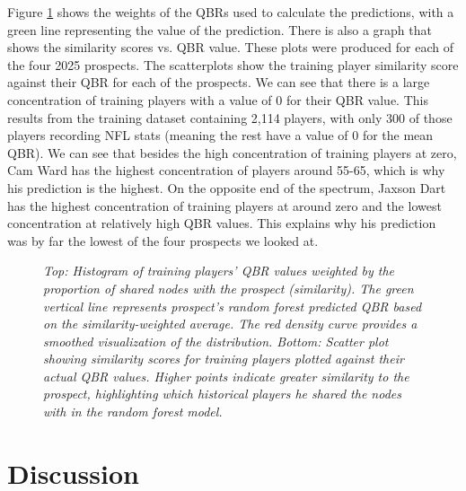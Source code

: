 \documentclass{article}
\begin{document}
Figure \ref{fig:prospect-plots} shows the weights of the QBRs used to calculate the predictions, with a green line representing the value of the prediction. There is also a graph that shows the similarity scores vs. QBR value. These plots were produced for each of the four 2025 prospects. The scatterplots show the training player similarity score against their QBR for each of the prospects. We can see that there is a large concentration of training players with a value of 0 for their QBR value. This results from the training dataset containing 2,114 players, with only 300 of those players recording NFL stats (meaning the rest have a value of 0 for the mean QBR). We can see that besides the high concentration of training players at zero, Cam Ward has the highest concentration of players around 55-65, which is why his prediction is the highest. On the opposite end of the spectrum, Jaxson Dart has the highest concentration of training players at around zero and the lowest concentration at relatively high QBR values. This explains why his prediction was by far the lowest of the four prospects we looked at.

\begin{figure}[H]
    \centering
    \caption{\textit{Top: Histogram of training players’ QBR values weighted by the proportion of shared nodes with the prospect (similarity). The green vertical line represents prospect’s random forest predicted QBR based on the similarity-weighted average. The red density curve provides a smoothed visualization of the distribution.
    Bottom: Scatter plot showing similarity scores for training players plotted against their actual QBR values. Higher points indicate greater similarity to the prospect, highlighting which historical players he shared the nodes with in the random forest model.}}
    \label{fig:prospect-plots}
\end{figure}

\section{Discussion}
\end{document}
